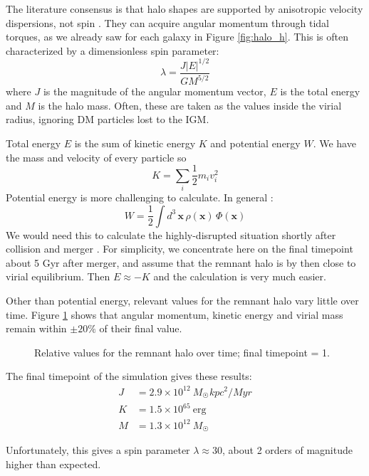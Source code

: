 \documentclass[twocolumn]{aastex63}
\newcommand{\todo}{\color{red}{TODO}\color{black}\hspace{2mm}}
\begin{document}
The literature consensus is that halo shapes are supported by anisotropic velocity dispersions, not spin \citep{frenk_dark_2012}. They can acquire angular momentum through tidal torques, as we already saw for each galaxy in Figure \ref{fig:halo_h}. This is often characterized by a dimensionless spin parameter:
\[ \lambda = \frac{J |E|^{1/2}}{G M^{5/2}} \]
where $J$ is the magnitude of the angular momentum vector, $E$ is the total energy and $M$ is the halo mass. Often, these are taken as the values inside the virial radius, ignoring DM particles lost to the IGM.

Total energy $E$ is the sum of kinetic energy $K$ and potential energy $W$. We have the mass and velocity of every particle so 
\[ K = \sum_i \frac{1}{2} m_i v_i^2 \]
Potential energy is more challenging to calculate. In general \citep[section 2.1]{binney_galactic_2008}:
\[ W = \frac{1}{2} \int d^3\, \mathbf{x}\, \rho(\mathbf{x})\, \Phi(\mathbf{x}) \]
We would need this to calculate the highly-disrupted situation shortly after collision and merger \citep[section 8.2]{binney_galactic_2008}. For simplicity, we concentrate here on the final timepoint about 5 Gyr after merger, and assume that the remnant halo is by then close to virial equilibrium. Then $E \approx -K$ and the calculation is very much easier.

Other than potential energy, relevant values for the remnant halo vary little over time. Figure \ref{fig:rem_data} shows that angular momentum, kinetic energy and virial mass remain within $\pm 20\%$ of their final value.

\begin{figure}[htb!]
	\caption{Relative values for the remnant halo over time; final timepoint = 1.
		\label{fig:rem_data}}
\end{figure}

The final timepoint of the simulation gives these results:
\begin{align*}
	J &= 2.9 \times 10^{12}\ M_\Sun kpc^2 / Myr\\
	K &= 1.5 \times 10^{65}\ \text{erg}\\
	M &= 1.3 \times 10^{12}\ M_\Sun
\end{align*}

Unfortunately, this gives a spin parameter $\lambda \approx 30$, about 2 orders of magnitude higher than expected.

\todo{\textbf{Figure out what went wrong!}}

\todo{\textbf{remnant DM $\sigma$}}
\end{document}
